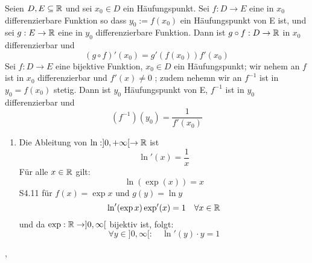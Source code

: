 \Satz[4.11] Seien \(D,E \subseteq \mathbb{R}\) und sei \(x_0 \in D\) ein Häufungspunkt. Sei \(f: D \rightarrow E\) eine in \(x_0\) differenzierbare Funktion so dass \(y_0 := f(x_0)\) ein Häufungspunkt von E ist, und sei \(g : E \rightarrow \mathbb{R} \) eine in \(y_0\) differenzierbare Funktion. Dann ist \(g \circ f : D \rightarrow \mathbb{R} \) in \(x_0\) differenzierbar und
\[ (g \circ f)'(x_0) = g'(f(x_0))f'(x_0)\]
\Korollar[4.12] Sei \(f : D \rightarrow E \) eine bijektive Funktion, \(x_0 \in D\) ein Häufungspunkt; wir nehem an \(f\) ist in \(x_0\) differenzierbar und \(f'(x) \neq 0\) ; zudem nehemn wir an \(f^{-1}\) ist in \(y_0 = f(x_0)\) stetig. Dann ist \(y_0\) Häufungspunkt von E, \(f^{-1}\) ist in \(y_0\) differenzierbar und
\[\left(f^{-1}\right)(y_0)= \frac{1}{f'(x_0)}\]
\newline \newline \newline \newline
\Bsp[4.13] \begin{enumerate}
    \item Die Ableitung von \(\ln : ]0, +\infty [ \rightarrow \mathbb{R}\) ist
    \[ \ln'(x) = \frac{1}{x}\]
    Für alle \(x \in \mathbb{R} \) gilt:
    \[ \ln(\exp(x)) = x\]
    S4.11 für \(f(x) = \exp x\) und \(g(y) = \ln y\)
    \[ \ln'(\exp x)\exp'(x) = 1 \quad \forall x \in \mathbb{R}\]
    und da \( \exp: \mathbb{R} \rightarrow ]0,\infty[\) bijektiv ist, folgt:
    \[ \forall y \in ]0,\infty[: \quad \ln'(y) \cdot y = 1\]
\end{enumerate}
\sep
